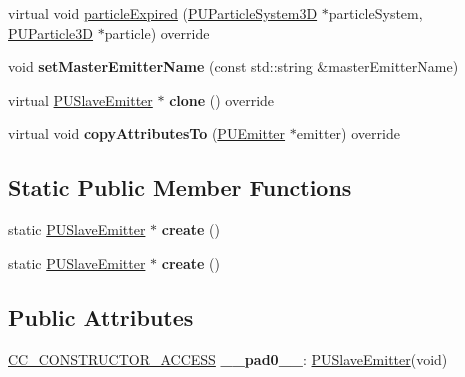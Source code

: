 \begin{DoxyCompactItemize}
\item 
virtual void \hyperlink{classPUSlaveEmitter_ac5ed7601bfe82c693ea912b81f14732b}{particle\+Expired} (\hyperlink{classPUParticleSystem3D}{P\+U\+Particle\+System3D} $\ast$particle\+System, \hyperlink{structPUParticle3D}{P\+U\+Particle3D} $\ast$particle) override
\item 
\mbox{\label{classPUSlaveEmitter_ab17fb354cca69c4c72ee57b47a08f8bc}} 
void {\bfseries set\+Master\+Emitter\+Name} (const std\+::string \&master\+Emitter\+Name)
\item 
\mbox{\label{classPUSlaveEmitter_a0f5d4d7733b6f8ef68fe658bb5e4d0c1}} 
virtual \hyperlink{classPUSlaveEmitter}{P\+U\+Slave\+Emitter} $\ast$ {\bfseries clone} () override
\item 
\mbox{\label{classPUSlaveEmitter_a1d3ecd1b67a294e174e0a4c18f49d997}} 
virtual void {\bfseries copy\+Attributes\+To} (\hyperlink{classPUEmitter}{P\+U\+Emitter} $\ast$emitter) override
\end{DoxyCompactItemize}
\subsection*{Static Public Member Functions}
\begin{DoxyCompactItemize}
\item 
\mbox{\label{classPUSlaveEmitter_aed2cbe2f9e7d5d204f3ff8cee71bcd42}} 
static \hyperlink{classPUSlaveEmitter}{P\+U\+Slave\+Emitter} $\ast$ {\bfseries create} ()
\item 
\mbox{\label{classPUSlaveEmitter_acae47f50f95d983ab881c00247cdc4d4}} 
static \hyperlink{classPUSlaveEmitter}{P\+U\+Slave\+Emitter} $\ast$ {\bfseries create} ()
\end{DoxyCompactItemize}
\subsection*{Public Attributes}
\begin{DoxyCompactItemize}
\item 
\mbox{\label{classPUSlaveEmitter_adc7edf8a7bc791d49b2ee53ab72c3766}} 
\hyperlink{_2cocos2d_2cocos_2base_2ccConfig_8h_a25ef1314f97c35a2ed3d029b0ead6da0}{C\+C\+\_\+\+C\+O\+N\+S\+T\+R\+U\+C\+T\+O\+R\+\_\+\+A\+C\+C\+E\+SS} {\bfseries \+\_\+\+\_\+pad0\+\_\+\+\_\+}\+: \hyperlink{classPUSlaveEmitter}{P\+U\+Slave\+Emitter}(void)
\end{DoxyCompactItemize}
